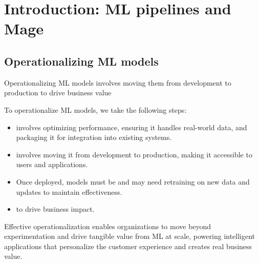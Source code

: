 \documentclass[letterpaper,12pt,notitlepage,twoside]{report}
\begin{document}
\section{Introduction: ML pipelines and Mage}
\subsection{Operationalizing ML models}
 \begin{funfact}[frametitle=\facttitlep{Fun Fact}{Operationalizing ML models}]
Operationalizing ML models involves moving them from development to production to drive business value
\end{funfact}

To operationalize ML models, we take the following steps:
\begin{itemize}[noitemsep, topsep=0pt]
\item \textbf{} involves optimizing performance, ensuring it handles real-world data, and packaging it for integration into existing systems.
\item \textbf{} involves moving it from development to production, making it accessible to users and applications.
\item Once deployed, models must be \textbf{} and may need retraining on new data and updates to maintain effectiveness.
\item \textbf{} to drive business impact.
\end{itemize}
Effective operationalization enables organizations to move beyond experimentation and drive tangible value from ML at scale, powering intelligent applications that personalize the customer experience and creates real business value.
\end{document}
